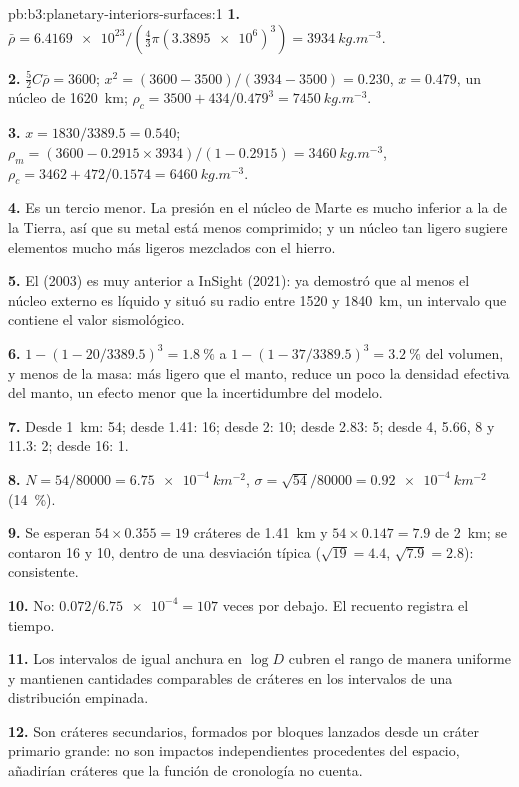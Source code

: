 \begin{solution}{pb:b3:planetary-interiors-surfaces:1}
\textbf{1.} $\bar\rho = \num{6.4169e23}/(\tfrac43\pi(\num{3.3895e6})^3) =
\qty{3934}{kg.m^{-3}}$.

\textbf{2.} $\tfrac52C\bar\rho = 3600$; $x^2 = (3600 - 3500)/(3934 - 3500) =
0.230$, $x = 0.479$, un núcleo de \qty{1620}{km}; $\rho_c = 3500 +
434/0.479^3 = \qty{7450}{kg.m^{-3}}$.

\textbf{3.} $x = 1830/3389.5 = 0.540$; $\rho_m = (3600 - 0.2915\times
3934)/(1 - 0.2915) = \qty{3460}{kg.m^{-3}}$, $\rho_c = 3462 +
472/0.1574 = \qty{6460}{kg.m^{-3}}$.

\textbf{4.} Es un tercio menor. La presión en el núcleo de Marte es mucho
inferior a la de la Tierra, así que su metal está menos comprimido; y un núcleo tan
ligero sugiere elementos mucho más ligeros mezclados con el hierro.

\textbf{5.} El  (2003) es muy anterior a InSight (2021): ya
demostró que al menos el núcleo externo es líquido y situó su
radio entre 1520 y \qty{1840}{km}, un intervalo que contiene el
valor sismológico.

\textbf{6.} $1 - (1 - 20/3389.5)^3 = \qty{1.8}{\percent}$ a $1 - (1 -
37/3389.5)^3 = \qty{3.2}{\percent}$ del volumen, y menos de la masa:
más ligero que el manto, reduce un poco la densidad efectiva del manto,
un efecto menor que la incertidumbre del modelo.

\textbf{7.} Desde \qty{1}{km}: 54; desde 1.41: 16; desde 2: 10; desde 2.83: 5;
desde 4, 5.66, 8 y 11.3: 2; desde 16: 1.

\textbf{8.} $N = 54/80000 = \qty{6.75e-4}{km^{-2}}$, $\sigma = \sqrt{54}/80000
= \qty{0.92e-4}{km^{-2}}$ (\qty{14}{\percent}).

\textbf{9.} Se esperan $54\times0.355 = 19$ cráteres de \qty{1.41}{km} y
$54\times0.147 = 7.9$ de \qty{2}{km}; se contaron 16 y 10, dentro de una
desviación típica ($\sqrt{19} = 4.4$, $\sqrt{7.9} = 2.8$): consistente.

\textbf{10.} No: $0.072/\num{6.75e-4} = 107$ veces por debajo. El recuento
registra el tiempo.

\textbf{11.} Los intervalos de igual anchura en $\log D$ cubren el rango de manera uniforme y
mantienen cantidades comparables de cráteres en los intervalos de una distribución empinada.

\textbf{12.} Son cráteres secundarios, formados por bloques lanzados desde un
cráter primario grande: no son impactos independientes procedentes del espacio, añadirían
cráteres que la función de cronología no cuenta.


\end{solution}
